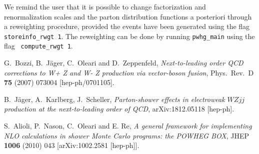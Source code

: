 \documentclass[a4paper,11pt]{article}
\begin{document}
We remind the user that it is possible to change factorization and
renormalization scales and the parton distribution functions a
posteriori through a reweighting procedure, provided the events have
been generated using the flag {\tt storeinfo\_rwgt 1}. The reweighting
can be done by running {\tt pwhg\_main} using the flag {\tt
  compute\_rwgt 1}.

%
\begin{thebibliography}{99}

  G.~Bozzi, B.~J\"ager, C.~Oleari and D.~Zeppenfeld,
  {\em Next-to-leading order QCD corrections to W+ Z and W- Z production via vector-boson fusion},
  Phys.\ Rev.\ D {\bf 75} (2007) 073004
  [hep-ph/0701105].


 B.~J\"ager, A.~Karlberg, J.~Scheller, {\em Parton-shower effects in electroweak $WZjj$ production at the next-to-leading order of QCD}, arXiv:1812.05118 [hep-ph].
  
 S.~Alioli, P.~Nason, C.~Oleari and E. Re, {\em
    A general framework for implementing NLO calculations in shower
    Monte Carlo programs: the POWHEG BOX}, JHEP {\bf 1006} (2010)
  043  [arXiv:1002.2581 [hep-ph]].

\end{thebibliography}
\end{document}
